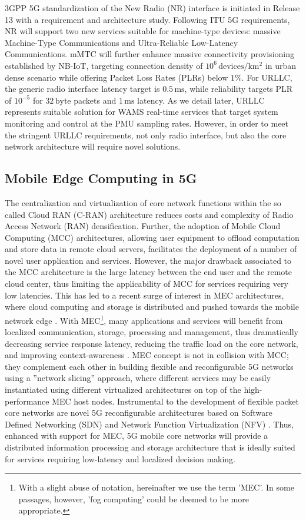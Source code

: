 \documentclass[journal]{IEEEtran}
\begin{document}
3GPP 5G standardization of the New Radio (NR) interface is initiated in Release 13 with a requirement and architecture study. Following ITU 5G requirements, NR will support two new services suitable for machine-type devices: massive Machine-Type Communications and Ultra-Reliable Low-Latency Communications. mMTC will further enhance massive connectivity provisioning established by NB-IoT, targeting connection density of $10^6\,\mathrm{devices/km^2}$ in urban dense scenario while offering Packet Loss Rates (PLRs) below $1 \%$. For URLLC, the generic radio interface latency target is $0.5\,\mathrm{ms}$, while reliability targets PLR of $10^{-5}$ for $32\,\mathrm{byte}$ packets and $1\,\mathrm{ms}$ latency. As we detail later, URLLC represents suitable solution for WAMS real-time services that target system monitoring and control at the PMU sampling rates. However, in order to meet the stringent URLLC requirements, not only radio interface, but also the core network architecture will require novel solutions. 

\subsection{Mobile Edge Computing in 5G}
 
The centralization and virtualization of core network functions within the so called Cloud RAN (C-RAN) architecture reduces costs and complexity of Radio Access Network (RAN) densification. Further, the adoption of Mobile Cloud Computing (MCC) architectures, allowing user equipment to offload computation and store data in remote cloud servers, facilitates the deployment of a number of novel user application and services. However, the major drawback associated to the MCC architecture is the large latency between the end user and the remote cloud center, thus limiting the applicability of MCC for services requiring very low latencies. This has led to a recent surge of interest in MEC architectures, where cloud computing and storage is distributed and pushed towards the mobile network edge \cite{young}. With MEC\footnote{With a slight abuse of notation, hereinafter we use the term 'MEC'. In some passages, however, 'fog computing' could be deemed to be more appropriate.}, many applications and services will benefit from localized communication, storage, processing and management, thus dramatically decreasing service response latency, reducing the traffic load on the core network, and improving context-awareness \cite{addepalli}. MEC concept is not in collision with MCC; they complement each other in building flexible and reconfigurable 5G networks using a ''network slicing'' approach, where different services may be easily instantiated using different virtualized architectures on top of the high-performance MEC host nodes. Instrumental to the development of flexible packet core networks are novel 5G reconfigurable architectures based on Software Defined Networking (SDN) and Network Function Virtualization (NFV) \cite{turtinen}. Thus, enhanced with support for MEC, 5G mobile core networks will provide a distributed information processing and storage architecture that is ideally suited for services requiring low-latency and localized decision making.    
 
\end{document}

